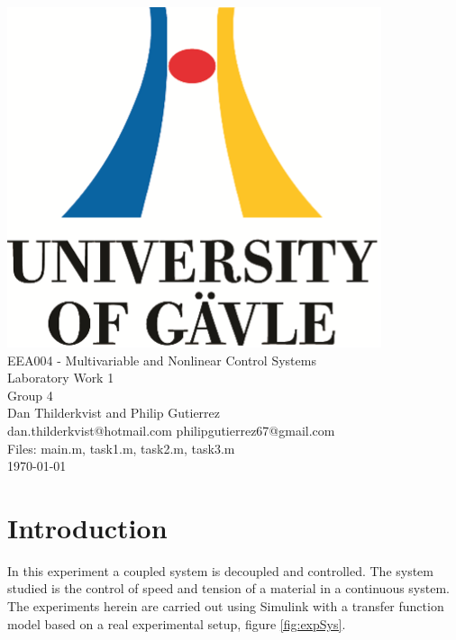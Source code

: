 \documentclass[a4paper, titlepage]{article}
\begin{document}

\begin{titlepage}
  \begin{center}
    \vspace*{1cm}
    \includegraphics[scale=1.0]{../figures/hig_logo_eng.png}\\
    \vspace{1.5cm}
    \large EEA004 - Multivariable and Nonlinear Control Systems\\
    \large Laboratory Work 1\\
    \vspace{1.5cm}
    Group 4\\
    Dan Thilderkvist and Philip Gutierrez\\
    dan.thilderkvist@hotmail.com philipgutierrez67@gmail.com\\
    Files: main.m, task1.m, task2.m, task3.m\\ 
    
    \vspace{1cm}
    \today
  \end{center}
\end{titlepage}

\section{Introduction}
In this experiment a coupled system is decoupled and controlled.
The system studied is the control of speed and tension of a material in a continuous system.
The experiments herein are carried out using Simulink with a transfer function model based on a real experimental setup, figure \ref{fig:expSys}.
\end{document}
